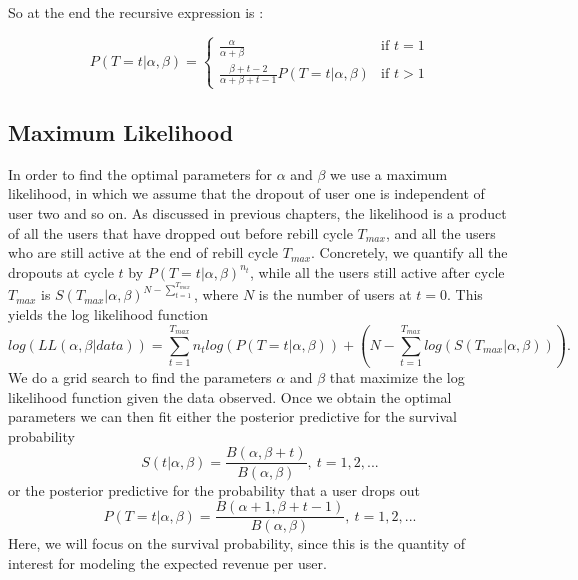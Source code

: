 \documentclass[paper=a4, fontsize=11pt]{scrartcl} %
\numberwithin{equation}{section} %
\numberwithin{figure}{section} %
\numberwithin{table}{section} %
\begin{document}
So at the end the recursive expression  is : 

\begin{equation} \label{eq5}
P(T=t | \alpha, \beta) = 
\left\{
	\begin{array}{ll}
		\frac{\alpha}{\alpha + \beta}  & \mbox{if } t =1 \\
		\frac{\beta + t -2}{\alpha + \beta + t -1}P(T=t|\alpha,\beta) & \mbox{if } t > 1
	\end{array}
\right.
\end{equation}


\subsection{Maximum Likelihood}
In order to find the optimal parameters for $\alpha$ and $\beta$ we use a maximum likelihood, in which we assume that the dropout of user one is independent of user two and so on. 
As discussed in previous chapters, the likelihood is a product of all the users that have dropped out before rebill cycle $T_{max}$, and all the users who are still active at the end of rebill cycle $T_{max}$. Concretely, we quantify all the dropouts at cycle $t$ by $P(T = t | \alpha, \beta)^{n_t}$, while all the users still active after cycle $T_{max}$ is $S(T_{max} | \alpha, \beta)^{N - \sum_{t=1}^{T_{max}}}$, where $N$ is the number of users at $t = 0$. This yields the log likelihood function
\begin{equation}
log(LL(\alpha, \beta | data)) = \sum_{t=1}^{T_{max}} n_t log(P(T = t | \alpha, \beta)) + \left(N - \sum_{t=1}^{T_{max}} log(S(T_{max} | \alpha, \beta)) \right).
\end{equation} 
We do a grid search to find the parameters $\alpha$ and $\beta$ that maximize the log likelihood function given the data observed. Once we obtain the optimal parameters we can then fit either the posterior predictive 
for the survival probability\\ 
\begin{equation}
S(t | \alpha, \beta) = \frac{B(\alpha, \beta + t)}{B(\alpha, \beta)}, ~ t = 1,2,...
\label{eq:survival_fct}
\end{equation}
or the posterior predictive for the probability that a user drops out\\
\begin{equation}
P(T = t | \alpha, \beta) = \frac{B(\alpha + 1, \beta + t - 1)}{B(\alpha, \beta)}, ~ t = 1,2,...
\end{equation}
Here, we will focus on the survival probability, since this is the quantity of interest for modeling the expected revenue per user.
\end{document}
